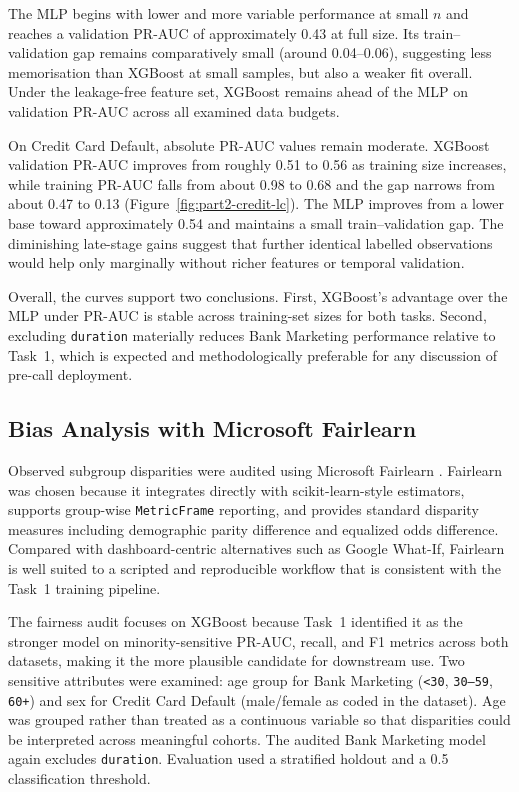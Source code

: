 The MLP begins with lower and more variable performance at small $n$ and reaches a
validation PR-AUC of approximately 0.43 at full size. Its train--validation gap remains
comparatively small (around 0.04--0.06), suggesting less memorisation than XGBoost at
small samples, but also a weaker fit overall. Under the leakage-free feature set,
XGBoost remains ahead of the MLP on validation PR-AUC across all examined data budgets.

On Credit Card Default, absolute PR-AUC values remain moderate. XGBoost validation
PR-AUC improves from roughly 0.51 to 0.56 as training size increases, while training
PR-AUC falls from about 0.98 to 0.68 and the gap narrows from about 0.47 to 0.13
(Figure~\ref{fig:part2-credit-lc}). The MLP improves from a lower base toward
approximately 0.54 and maintains a small train--validation gap. The diminishing
late-stage gains suggest that further identical labelled observations would help only
marginally without richer features or temporal validation.

Overall, the curves support two conclusions. First, XGBoost's advantage over the MLP
under PR-AUC is stable across training-set sizes for both tasks. Second, excluding
\texttt{duration} materially reduces Bank Marketing performance relative to Task~1,
which is expected and methodologically preferable for any discussion of pre-call
deployment.


\subsection{Bias Analysis with Microsoft Fairlearn}
\label{sec:part2-fairness}

Observed subgroup disparities were audited using Microsoft Fairlearn
\cite{bird2020fairlearn}. Fairlearn was chosen because it integrates directly with
scikit-learn-style estimators, supports group-wise \texttt{MetricFrame} reporting, and
provides standard disparity measures including demographic parity difference and
equalized odds difference. Compared with dashboard-centric alternatives such as
Google What-If, Fairlearn is well suited to a scripted and reproducible workflow that
is consistent with the Task~1 training pipeline.

The fairness audit focuses on XGBoost because Task~1 identified it as the stronger
model on minority-sensitive PR-AUC, recall, and F1 metrics across both datasets,
making it the more plausible candidate for downstream use. Two sensitive attributes
were examined: age group for Bank Marketing (\texttt{<30}, \texttt{30--59},
\texttt{60+}) and sex for Credit Card Default (male/female as coded in the dataset).
Age was grouped rather than treated as a continuous variable so that disparities could
be interpreted across meaningful cohorts. The audited Bank Marketing model again
excludes \texttt{duration}. Evaluation used a stratified holdout and a 0.5
classification threshold.

